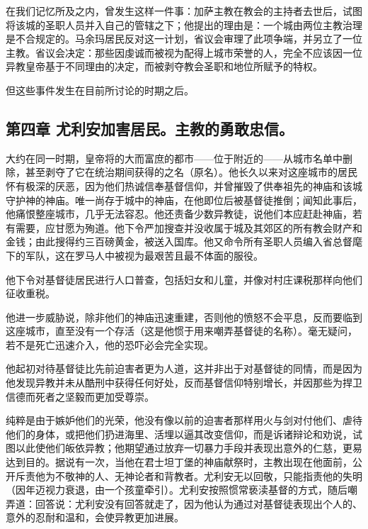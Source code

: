 在我们记忆所及之内，曾发生这样一件事：加萨主教在教会的主持者去世后，试图将该城的圣职人员并入自己的管辖之下；他提出的理由是：一个城由两位主教治理是不合规定的。马余玛居民反对这一计划，省议会审理了此项争端，并另立了一位主教。省议会决定：那些因虔诚而被视为配得上城市荣誉的人，完全不应该因一位异教皇帝基于不同理由的决定，而被剥夺教会圣职和地位所赋予的特权。\par

但这些事件发生在目前所讨论的时期之后。\par


\subsection{第四章  尤利安加害居民。主教的勇敢忠信。}

大约在同一时期，皇帝将的大而富庶的都市——位于附近的——从城市名单中删除，甚至剥夺了它在统治期间获得的之名（原名）。他长久以来对这座城市的居民怀有极深的厌恶，因为他们热诚信奉基督信仰，并曾摧毁了供奉祖先的神庙和该城守护神的神庙。唯一尚存于城中的神庙，在他即位后被基督徒推倒；闻知此事后，他痛恨整座城市，几乎无法容忍。他还责备少数异教徒，说他们本应赶赴神庙，若有需要，应甘愿为殉道。他下令严加搜查并没收属于城及其郊区的所有教会财产和金钱；由此搜得约三百磅黄金，被送入国库。他又命令所有圣职人员编入省总督麾下的军队，这在罗马人中被视为最艰苦且最不体面的服役。\par

他下令对基督徒居民进行人口普查，包括妇女和儿童，并像对村庄课税那样向他们征收重税。\par

他进一步威胁说，除非他们的神庙迅速重建，否则他的愤怒不会平息，反而要临到这座城市，直至没有一个存活（这是他惯于用来嘲弄基督徒的名称）。毫无疑问，若不是死亡迅速介入，他的恐吓必会完全实现。\par

他起初对待基督徒比先前迫害者更为人道，这并非出于对基督徒的同情，而是因为他发现异教并未从酷刑中获得任何好处，反而基督信仰特别增长，并因那些为捍卫信德而死者之坚毅而更加受尊崇。\par

纯粹是由于嫉妒他们的光荣，他没有像以前的迫害者那样用火与剑对付他们、虐待他们的身体，或把他们扔进海里、活埋以逼其改变信仰，而是诉诸辩论和劝说，试图以此使他们皈依异教；他期望通过放弃一切暴力手段并表现出意外的仁慈，更易达到目的。据说有一次，当他在君士坦丁堡的神庙献祭时，主教出现在他面前，公开斥责他为不敬神的人、无神论者和背教者。尤利安无以回敬，只能指责他的失明（因年迈视力衰退，由一个孩童牵引）。尤利安按照惯常亵渎基督的方式，随后嘲弄道：回答说：尤利安没有回答就走了，因为他认为通过对基督徒表现出个人的、意外的忍耐和温和，会使异教更加进展。\par


